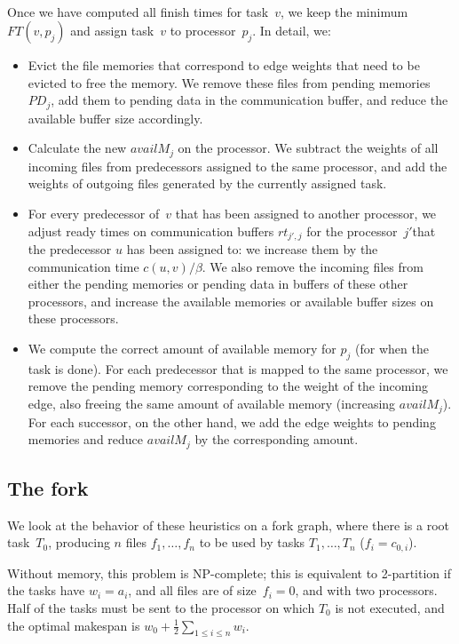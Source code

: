 \documentclass[conference]{IEEEtran}
\begin{document}
    \medskip
    \\
    Once we have computed all finish times for task~$v$,
    we keep the minimum $FT(v,p_j)$ and assign task~$v$
    to processor~$p_j$.
    In detail, we:
    \begin{itemize}
        \item  Evict the file memories that correspond to edge weights that need to be evicted to free the memory.
        We remove these files from pending memories
        $PD_j$, add them to pending data in the communication buffer, and reduce the available buffer size accordingly.
        \item    Calculate the new $availM_j$ on the processor.
        We subtract the weights of all incoming files from predecessors assigned to the same processor,
        and add the weights of outgoing files generated by the currently assigned task.
        \item  For every predecessor of~$v$ that has been assigned to another processor, we adjust ready times on
        communication buffers $rt_{j', j}$ for the processor~$j'$that the predecessor $u$ has been assigned to: we increase them by the
        communication time $c( u,v) / \beta$.
        We also remove the incoming files from either the pending memories or pending data in buffers of these other
        processors, and increase the available memories or available buffer sizes on these processors.
        \item We compute the correct amount of available memory for $p_j$ (for when the task is done).
        For each predecessor that is mapped to the same processor, we remove the pending memory corresponding to the weight of
        the incoming edge, also freeing the same amount of available memory (increasing $availM_j$).
        For each successor, on the other hand, we add the edge weights to pending memories and reduce $availM_j$ by the corresponding
        amount.
    \end{itemize}

    \subsection{The fork}
    We look at the behavior of these heuristics on a fork graph,
    where there is a root task~$T_0$, producing $n$ files $f_1, \ldots, f_n$
    to be used by tasks $T_1, \ldots, T_n$ ($f_i = c_{0,i}$).

    Without memory, this problem is NP-complete; this is equivalent
    to 2-partition if the tasks have $w_i=a_i$, and all files are of size~$f_i=0$,
    and with two processors. Half of the tasks must be sent to the processor
    on which $T_0$ is not executed, and the optimal makespan is
    $w_0+\frac{1}{2}\sum_{1\leq i \leq n} w_i$.
\end{document}
